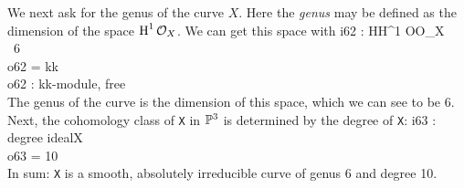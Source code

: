 We next ask for the genus of the curve $X$.
Here the {\it genus} may be defined as the dimension of
the space $\operatorname{H}\nolimits^1\cO_X$. 
We can get this space with
\beginOutput
i62 : HH^1 OO_X\\
\emptyLine
\        6\\
o62 = kk\\
\emptyLine
o62 : kk-module, free\\
\endOutput
The genus of the curve is the dimension of this space,
which we can see to be 6.
Next, the cohomology class of {\tt X} in $\P^3$ is determined
by the degree of {\tt X}:
\beginOutput
i63 : degree idealX\\
\emptyLine
o63 = 10\\
\endOutput
In sum: {\tt X} is a smooth, absolutely irreducible curve of 
genus 6 and degree 10.

